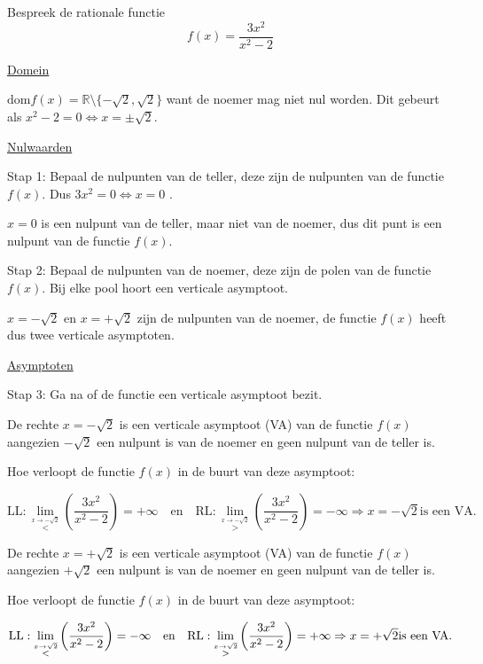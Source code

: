 \begin{voorbeeld}
Bespreek de rationale functie 
\begin{equation*}
f(x)=\frac{3x^{2}}{x^{2}-2}
\end{equation*}

\underline{Domein}

$\textrm{dom}f(x)=\mathbb{R}\setminus\{-\sqrt{2},\sqrt{2}\}$ want de noemer mag niet nul worden. Dit gebeurt als ${\displaystyle x^{2}-2=0}\Longleftrightarrow x=\pm\sqrt{2}$.

\underline{Nulwaarden}

Stap 1: Bepaal de nulpunten van de teller, deze zijn de nulpunten
van de functie $f(x)$. Dus $3x^{2}=0\Longleftrightarrow x=0$ .

$x=0$ is een nulpunt van de teller, maar niet van de noemer, dus
dit punt is een nulpunt van de functie $f(x)$.

Stap 2: Bepaal de nulpunten van de noemer, deze zijn de polen van
de functie $f(x)$. Bij elke pool hoort een verticale asymptoot.

$x=-\sqrt{2}$ en $x=+\sqrt{2}$ zijn de nulpunten van de noemer,
de functie $f(x)$ heeft dus twee verticale asymptoten.

\underline{Asymptoten}

Stap 3: Ga na of de functie een verticale asymptoot bezit. 

De rechte $x=-\sqrt{2}$ is een verticale asymptoot (VA) van de functie
$f(x)$ aangezien $-\sqrt{2}$ een nulpunt is van de noemer en geen
nulpunt van de teller is.

Hoe verloopt de functie $f(x)$ in de buurt van deze asymptoot:

\begin{equation*}
\textrm{LL}: \lim_{\overset{x\rightarrow-\sqrt{2}}{<}}\left(\frac{3x^{2}}{x^{2}-2}\right)=+\infty\quad\textrm{en}\quad \textrm{RL}:\lim_{\overset{x\rightarrow-\sqrt{2}}{>}}\left(\frac{3x^{2}}{x^{2}-2}\right)=-\infty
\Rightarrow x=-\sqrt{2} \text{is een VA.}
\end{equation*}

De rechte $x=+\sqrt{2}$ is een verticale asymptoot (VA) van de functie
$f(x)$ aangezien $+\sqrt{2}$ een nulpunt is van de noemer en geen
nulpunt van de teller is.

Hoe verloopt de functie $f(x)$ in de buurt van deze asymptoot:

\begin{equation*}
\textrm{LL}: \lim_{\overset{x\rightarrow\sqrt{2}}{<}}\left(\frac{3x^{2}}{x^{2}-2}\right)=-\infty\quad\textrm{en}\quad \textrm{RL}:\lim_{\overset{x\rightarrow\sqrt{2}}{>}}\left(\frac{3x^{2}}{x^{2}-2}\right)=+\infty \\
\Rightarrow x=+\sqrt{2} \text{is een VA.}
\end{equation*}



\end{voorbeeld}
